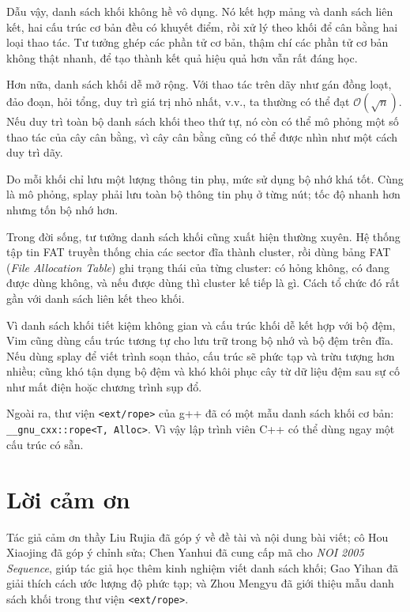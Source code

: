 \documentclass[11pt]{article}
\newcommand{\Oh}{\mathcal{O}}
\begin{document}
Dẫu vậy, danh sách khối không hề vô dụng. Nó kết hợp mảng và danh sách liên
kết, hai cấu trúc cơ bản đều có khuyết điểm, rồi xử lý theo khối để cân bằng
hai loại thao tác. Tư tưởng ghép các phần tử cơ bản, thậm chí các phần tử cơ
bản không thật nhanh, để tạo thành kết quả hiệu quả hơn vẫn rất đáng học.

Hơn nữa, danh sách khối dễ mở rộng. Với thao tác trên dãy như gán đồng loạt,
đảo đoạn, hỏi tổng, duy trì giá trị nhỏ nhất, v.v., ta thường có thể đạt
\(\Oh(\sqrt n)\). Nếu duy trì toàn bộ danh sách khối theo thứ tự, nó còn có
thể mô phỏng một số thao tác của cây cân bằng, vì cây cân bằng cũng có thể
được nhìn như một cách duy trì dãy.

Do mỗi khối chỉ lưu một lượng thông tin phụ, mức sử dụng bộ nhớ khá tốt. Cùng
là mô phỏng, splay phải lưu toàn bộ thông tin phụ ở từng nút; tốc độ nhanh hơn
nhưng tốn bộ nhớ hơn.

Trong đời sống, tư tưởng danh sách khối cũng xuất hiện thường xuyên. Hệ thống
tập tin FAT truyền thống chia các sector đĩa thành cluster, rồi dùng bảng FAT
(\textit{File Allocation Table}) ghi trạng thái của từng cluster: có hỏng
không, có đang được dùng không, và nếu được dùng thì cluster kế tiếp là gì.
Cách tổ chức đó rất gần với danh sách liên kết theo khối.

Vì danh sách khối tiết kiệm không gian và cấu trúc khối dễ kết hợp với bộ
đệm, Vim cũng dùng cấu trúc tương tự cho lưu trữ trong bộ nhớ và bộ đệm trên
đĩa. Nếu dùng splay để viết trình soạn thảo, cấu trúc sẽ phức tạp và trừu
tượng hơn nhiều; cũng khó tận dụng bộ đệm và khó khôi phục cây từ dữ liệu
đệm sau sự cố như mất điện hoặc chương trình sụp đổ.

Ngoài ra, thư viện \texttt{\textless ext/rope\textgreater} của g++ đã có một
mẫu danh sách khối cơ bản: \texttt{\_\_gnu\_cxx::rope<T, Alloc>}. Vì vậy lập
trình viên C++ có thể dùng ngay một cấu trúc có sẵn.

\section*{Lời cảm ơn}

Tác giả cảm ơn thầy Liu Rujia đã góp ý về đề tài và nội dung bài viết; cô Hou
Xiaojing đã góp ý chỉnh sửa; Chen Yanhui đã cung cấp mã cho \textit{NOI 2005
Sequence}, giúp tác giả học thêm kinh nghiệm viết danh sách khối; Gao Yihan
đã giải thích cách ước lượng độ phức tạp; và Zhou Mengyu đã giới thiệu mẫu
danh sách khối trong thư viện \texttt{\textless ext/rope\textgreater}.
\end{document}
